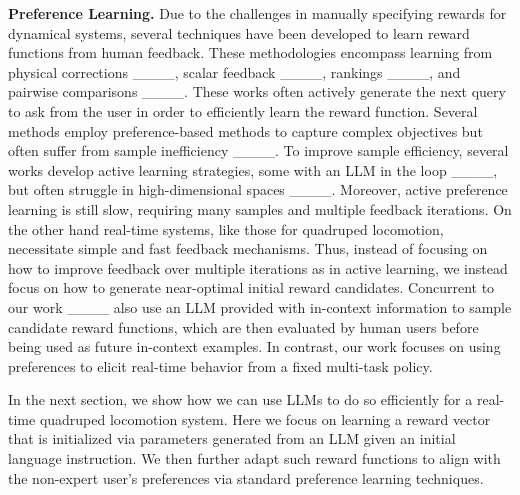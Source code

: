 \noindent\textbf{Preference Learning.} 
Due to the challenges in manually specifying rewards for dynamical systems, several techniques have been developed to learn reward functions from human feedback. These methodologies encompass learning from 
physical corrections ____, scalar feedback ____, rankings ____, and pairwise comparisons ____. 
These works often actively generate the next query to ask from the user in order to efficiently learn the reward function. Several methods employ preference-based methods to capture complex objectives but often suffer from sample inefficiency ____. 
To improve sample efficiency, several works develop active learning strategies, some with an LLM in the loop ____, but often struggle in high-dimensional spaces ____. Moreover, active preference learning is still slow, requiring many samples and multiple feedback iterations. On the other hand real-time systems, like those for quadruped locomotion, necessitate simple and fast feedback mechanisms. Thus, instead of focusing on how to improve feedback over multiple iterations as in active learning, we instead focus on how to generate near-optimal initial reward candidates. Concurrent to our work ____ also use an LLM provided with in-context information to sample candidate reward functions, which are then evaluated by human users before being used as future in-context examples. In contrast, our work focuses on using preferences to elicit real-time behavior from a fixed multi-task policy.

In the next section, we show how we can use LLMs to do so efficiently for a real-time quadruped locomotion system. Here we focus on learning a reward vector that is initialized via parameters generated from an LLM given an initial language instruction. We then further adapt such reward functions to align with the non-expert user's preferences via standard preference learning techniques. 

